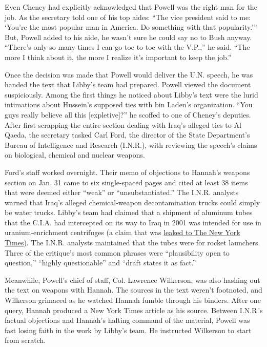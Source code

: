 Even Cheney had explicitly acknowledged that Powell was the right man
for the job. As the secretary told one of his top aides: ``The vice
president said to me: `You're the most popular man in America. Do
something with that popularity.''' But, Powell added to his aide, he
wasn't sure he could say no to Bush anyway. ``There's only so many times
I can go toe to toe with the V.P.,'' he said. ``The more I think about
it, the more I realize it's important to keep the job.''

Once the decision was made that Powell would deliver the U.N. speech, he
was handed the text that Libby's team had prepared. Powell viewed the
document suspiciously. Among the first things he noticed about Libby's
text were the lurid intimations about Hussein's supposed ties with bin
Laden's organization. ``You guys really believe all this
{[}expletive{]}?'' he scoffed to one of Cheney's deputies. After first
scrapping the entire section dealing with Iraq's alleged ties to Al
Qaeda, the secretary tasked Carl Ford, the director of the State
Department's Bureau of Intelligence and Research (I.N.R.), with
reviewing the speech's claims on biological, chemical and nuclear
weapons.

Ford's staff worked overnight. Their memo of objections to Hannah's
weapons section on Jan. 31 came to six single-spaced pages and cited at
least 38 items that were deemed either ``weak'' or ``unsubstantiated.''
The I.N.R. analysts warned that Iraq's alleged chemical-weapon
decontamination trucks could simply be water trucks. Libby's team had
claimed that a shipment of aluminum tubes that the C.I.A. had
intercepted on its way to Iraq in 2001 was intended for use in
uranium-enrichment centrifuges (a claim that was
\href{https://www.nytimes.com/2002/09/08/world/threats-responses-iraqis-us-says-hussein-intensifies-quest-for-bomb-parts.html}{leaked
to The New York Times}). The I.N.R. analysts maintained that the tubes
were for rocket launchers. Three of the critique's most common phrases
were ``plausibility open to question,'' ``highly questionable'' and
``draft states it as fact.''

Meanwhile, Powell's chief of staff, Col. Lawrence Wilkerson, was also
hashing out the text on weapons with Hannah. The sources in the text
weren't footnoted, and Wilkerson grimaced as he watched Hannah fumble
through his binders. After one query, Hannah produced a New York Times
article as his source. Between I.N.R.'s factual objections and Hannah's
halting command of the material, Powell was fast losing faith in the
work by Libby's team. He instructed Wilkerson to start from scratch.

